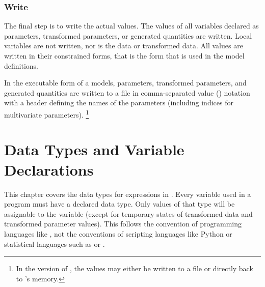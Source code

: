 \subsection{Write}

The final step is to write the actual values.  The values of all
variables declared as parameters, transformed parameters, or generated
quantities are written.  Local variables are not written, nor is the
data or transformed data.  All values are written in their constrained
forms, that is the form that is used in the model definitions.

In the executable form of a \Stan models, parameters, transformed
parameters, and generated quantities are written to a file in
comma-separated value () notation with a header defining
the names of the parameters (including indices for multivariate
parameters).%
\footnote{In the \R version of \Stan, the values may either be
written to a  file or directly back to \R's memory.}




\chapter{Data Types and Variable Declarations}\label{data-types.chapter}

\noindent 
This chapter covers the data types for expressions in \Stan.  Every
variable used in a \Stan program must have a declared data type.  Only
values of that type will be assignable to the variable (except for
temporary states of transformed data and transformed parameter
values).  This follows the convention of programming languages like
\Cpp, not the conventions of scripting languages like Python or
statistical languages such as \R or \BUGS.  

